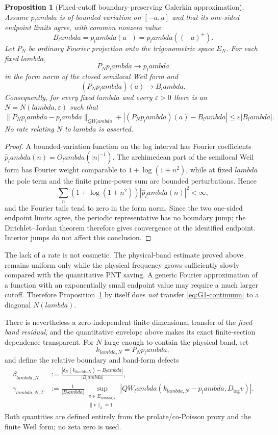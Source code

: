 \documentclass[11pt]{article}
\def\lambda{lambda}%
\newtheorem{proposition}[theorem]{Proposition}
\theoremstyle{remark}
\begin{document}
\begin{proposition}[Fixed-cutoff boundary-preserving Galerkin approximation]\label{prop:boundary-galerkin}
Assume $p_\lambda$ is of bounded variation on $[-a,a]$ and that its one-sided endpoint limits agree, with common nonzero value
\[
 B_\lambda=p_\lambda(a^-)=p_\lambda((-a)^+).
\]
Let $P_N$ be ordinary Fourier projection onto the trigonometric space $E_N$.  For each fixed $\lambda$,
\[
 P_Np_\lambda\to p_\lambda
\]
in the form norm of the closed semilocal Weil form and
\[
 (P_Np_\lambda)(a)\to B_\lambda.
\]
Consequently, for every fixed $\lambda$ and every $\varepsilon>0$ there is an $N=N(\lambda,\varepsilon)$ such that
\[
 \|P_Np_\lambda-p_\lambda\|_{QW_\lambda}
 +|(P_Np_\lambda)(a)-B_\lambda|
 \le \varepsilon |B_\lambda|.
\]
No rate relating $N$ to $\lambda$ is asserted.
\end{proposition}
\begin{proof}
A bounded-variation function on the log interval has Fourier coefficients $\widehat p_\lambda(n)=O_\lambda(|n|^{-1})$.  The archimedean part of the semilocal Weil form has Fourier weight comparable to $1+\log(1+n^2)$, while at fixed $\lambda$ the pole term and the finite prime-power sum are bounded perturbations.  Hence
\[
 \sum_n(1+\log(1+n^2))|\widehat p_\lambda(n)|^2<\infty,
\]
and the Fourier tails tend to zero in the form norm.  Since the two one-sided endpoint limits agree, the periodic representative has no boundary jump; the Dirichlet--Jordan theorem therefore gives convergence at the identified endpoint.  Interior jumps do not affect this conclusion.
\end{proof}

The lack of a rate is not cosmetic.  The physical-band estimate proved above remains uniform only while the physical frequency grows sufficiently slowly compared with the quantitative PNT saving.  A generic Fourier approximation of a function with an exponentially small endpoint value may require a much larger cutoff.  Therefore Proposition~\ref{prop:boundary-galerkin} by itself does \emph{not} transfer \eqref{eq:G1-continuum} to a diagonal $N(\lambda)$.

There is nevertheless a zero-independent finite-dimensional transfer of the
\emph{fixed-band residual}, and the quantitative envelope above makes its exact
finite-section dependence transparent.  For $N$ large enough to contain the
physical band, set
\[
 k_{\lambda,N}=P_Np_\lambda,
\]
and define the relative boundary and band-form defects
\begin{align}
 \beta_{\lambda,N}
 &:=\frac{|\delta_N(k_{\lambda,N})-B_\lambda|}{|B_\lambda|},
 \label{eq:g1-beta}\\
 \gamma_{\lambda,N,T}
 &:=\frac1{|B_\lambda|}
 \sup_{\substack{v\in E_{\lambda,T}\\\|v\|_2=1}}
 |QW_\lambda(k_{\lambda,N}-p_\lambda,D_{\log}v)|.
 \label{eq:g1-gamma}
\end{align}
Both quantities are defined entirely from the prolate/co-Poisson proxy and the
finite Weil form; no zeta zero is used.
\end{document}
